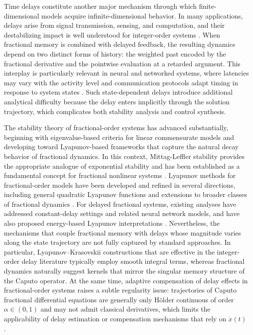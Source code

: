 \documentclass[12pt,a4paper]{article}
\begin{document}
Time delays constitute another major mechanism through which finite-dimensional models acquire infinite-dimensional behavior. In many applications, delays arise from signal transmission, sensing, and computation, and their destabilizing impact is well understood for integer-order systems \cite{gu2003,fridman2014}. When fractional memory is combined with delayed feedback, the resulting dynamics depend on two distinct forms of history: the weighted past encoded by the fractional derivative and the pointwise evaluation at a retarded argument. This interplay is particularly relevant in neural and networked systems, where latencies may vary with the activity level and communication protocols adapt timing in response to system states \cite{kaslik2012,wang2015}. Such state-dependent delays introduce additional analytical difficulty because the delay enters implicitly through the solution trajectory, which complicates both stability analysis and control synthesis.

The stability theory of fractional-order systems has advanced substantially, beginning with eigenvalue-based criteria for linear commensurate models \cite{matignon1996} and developing toward Lyapunov-based frameworks that capture the natural decay behavior of fractional dynamics. In this context, Mittag-Leffler stability provides the appropriate analogue of exponential stability and has been established as a fundamental concept for fractional nonlinear systems \cite{li2009}. Lyapunov methods for fractional-order models have been developed and refined in several directions, including general quadratic Lyapunov functions and extensions to broader classes of fractional dynamics \cite{aguila2014,duarte2015}. For delayed fractional systems, existing analyses have addressed constant-delay settings and related neural network models, and have also proposed energy-based Lyapunov interpretations \cite{chen2012delay,liu2016,trigeassou2011}. Nevertheless, the mechanisms that couple fractional memory with delays whose magnitude varies along the state trajectory are not fully captured by standard approaches. In particular, Lyapunov--Krasovskii constructions that are effective in the integer-order delay literature typically employ smooth integral terms, whereas fractional dynamics naturally suggest kernels that mirror the singular memory structure of the Caputo operator. At the same time, adaptive compensation of delay effects in fractional-order systems raises a subtle regularity issue: trajectories of Caputo fractional differential equations are generally only H\"older continuous of order $\alpha\in(0,1)$ and may not admit classical derivatives, which limits the applicability of delay estimation or compensation mechanisms that rely on $\dot{x}(t)$ \cite{diethelm2010}.
\end{document}
